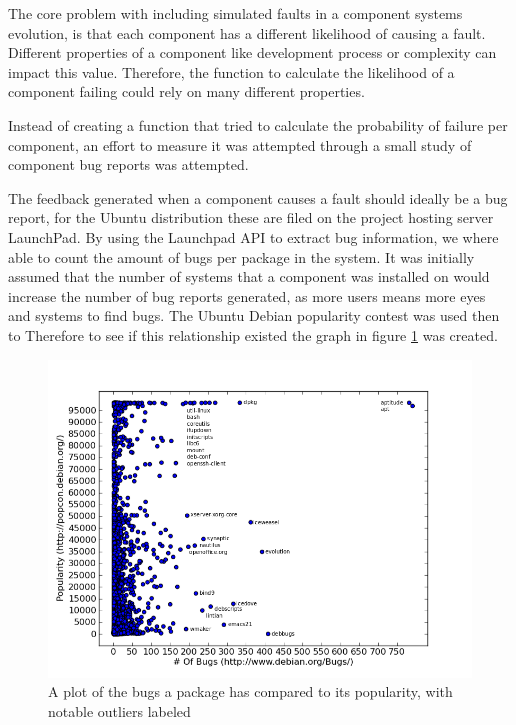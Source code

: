 The core problem with including simulated faults in a component systems evolution, is that each component has a different likelihood of causing a fault.
Different properties of a component like development process or complexity can impact this value.
Therefore, the function to calculate the likelihood of a component failing could rely on many different properties.

Instead of creating a function that tried to calculate the probability of failure per component,
an effort to measure it was attempted through a small study of component bug reports was attempted.

The feedback generated when a component causes a fault should ideally be a bug report, for the Ubuntu distribution these are filed on the project hosting server LaunchPad.
By using the Launchpad API to extract bug information, we where able to count the amount of bugs per package in the system.
It was initially assumed that the number of systems that a component was installed on would increase the number of bug reports generated,
as more users means more eyes and systems to find bugs.
The Ubuntu Debian popularity contest was used then to  
Therefore to see if this relationship existed the graph in figure \ref{bugsvspop} was created.

\begin{figure}[htp]
\begin{center}
  \includegraphics[width=\textwidth]{simulationpics/bugsvspopularity}
  \caption[Bugs v.s. Popularity]{A plot of the bugs a package has compared to its popularity, with notable outliers labeled}
  \label{bugsvspop}
\end{center}
\end{figure}

